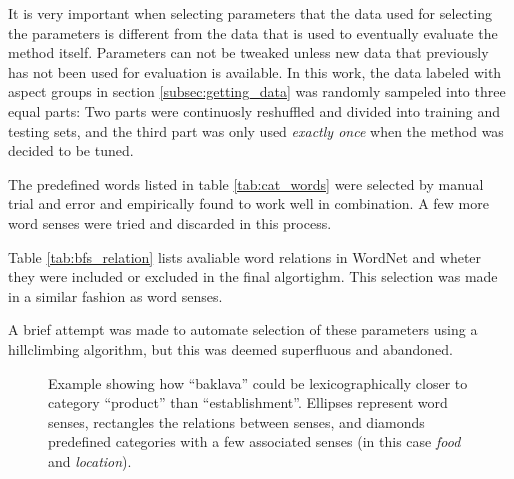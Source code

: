 \documentclass[a4paper,11pt]{kth-mag}
\begin{document}
It is very important when selecting parameters that the data used for selecting the parameters is different from the data that is used to eventually evaluate the method itself. Parameters can not be tweaked unless new data that previously has not been used for evaluation is available. In this work, the data labeled with aspect groups in section \ref{subsec:getting_data} was randomly sampeled into three equal parts: Two parts were continuosly reshuffled and divided into training and testing sets, and the third part was only used \emph{exactly once} when the method was decided to be tuned.

The predefined words listed in table \ref{tab:cat_words} were selected by manual trial and error and empirically found to work well in combination. A few more word senses were tried and discarded in this process.

Table \ref{tab:bfs_relation} lists avaliable word relations in WordNet and wheter they were included or excluded in the final algortighm. This selection was made in a similar fashion as word senses.

A brief attempt was made to automate selection of these parameters using a hillclimbing algorithm, but this was deemed superfluous and abandoned.

\begin{figure}[t]
  \centering
  \caption{Example showing how ``baklava'' could be lexicographically closer to category ``product'' than ``establishment''. Ellipses represent word senses, rectangles the relations between senses, and diamonds predefined categories with a few associated senses (in this case \emph{food} and \emph{location}).}
  \label{fig:baklava_lex}
\end{figure}
\end{document}
